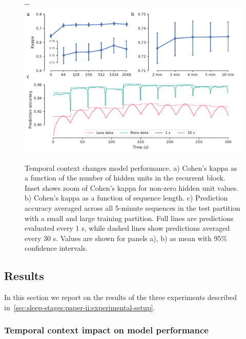 \begin{figure}[t]
\begin{adjustwidth*}{}{-\marginparwidth-\marginparsep}
    \includegraphics[width=\linewidth]{figures/paper-ii/figure_02_a-c.pdf}
    \caption[\acs{MASSC}v2 temporal context]{Temporal context changes model performance. a) Cohen's kappa as a function of the number of hidden units in the recurrent block. Inset shows zoom of Cohen's kappa for non-zero hidden unit values. b) Cohen's kappa as a function of sequence length. c) Prediction accuracy averaged across all 5-minute sequences in the test partition with a small and large training partition. Full lines are predictions evaluated every 1 s, while dashed lines show predictions averaged every 30 s. Values are shown for panels a), b) as mean with 95\% confidence intervals.}
    \label{fig:sleep-stages:paper-ii:figure-02}
\end{adjustwidth*}
\end{figure}

\subsection{Results}

In this section we report on the results of the three experiments described in~\cref{sec:sleep-stages:paper-ii:experimental-setup}.

\subsubsection{Temporal context impact on model performance}

